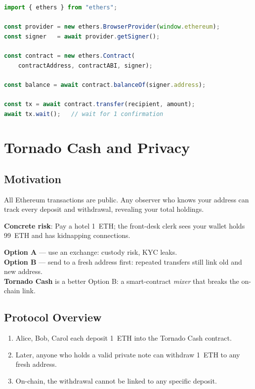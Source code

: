 \documentclass[12pt,a4paper,openany]{book}
\theoremstyle{definition}
\theoremstyle{plain}
\theoremstyle{remark}
\begin{document}
\begin{lstlisting}[language=JavaScript,caption=ethers.js basics]
import { ethers } from "ethers";

const provider = new ethers.BrowserProvider(window.ethereum);
const signer   = await provider.getSigner();

const contract = new ethers.Contract(
    contractAddress, contractABI, signer);

const balance = await contract.balanceOf(signer.address);

const tx = await contract.transfer(recipient, amount);
await tx.wait();   // wait for 1 confirmation
\end{lstlisting}


\chapter{Tornado Cash and Privacy}
\label{chap:tornado}

\section{Motivation}

All Ethereum transactions are public.  Any observer who knows your
address can track every deposit and withdrawal, revealing your total
holdings.

\textbf{Concrete risk}: Pay a hotel 1~ETH; the front-desk clerk sees
your wallet holds 99~ETH and has kidnapping connections.

\textbf{Option A} — use an exchange: custody risk, KYC leaks.\\
\textbf{Option B} — send to a fresh address first: repeated
transfers still link old and new address.\\
\textbf{Tornado Cash} is a better Option B: a smart-contract
\emph{mixer} that breaks the on-chain link.

\section{Protocol Overview}

\begin{enumerate}
  \item Alice, Bob, Carol each deposit 1~ETH into the Tornado Cash
        contract.
  \item Later, anyone who holds a valid private note can withdraw 1~ETH
        to any fresh address.
  \item On-chain, the withdrawal cannot be linked to any specific deposit.
\end{enumerate}
\end{document}
